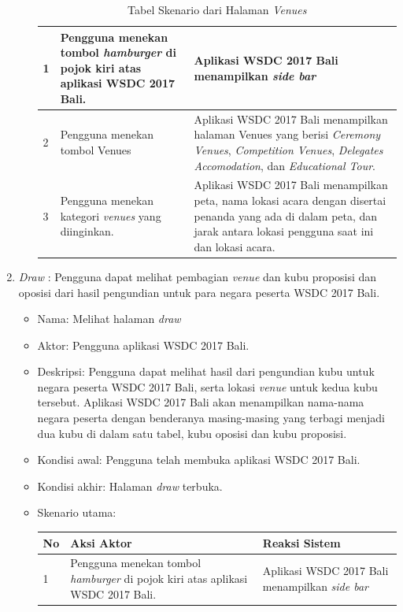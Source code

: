 \begin{enumerate}
\begin{itemize}
\begin{table}[H]
\begin{tabular}{|p{0.5cm}|p{7cm}|p{7cm}|}
				1  & Pengguna menekan tombol {\it hamburger} di pojok kiri atas aplikasi WSDC 2017 Bali. & Aplikasi WSDC 2017 Bali menampilkan {\it side bar} \\ \hline
				2  & Pengguna menekan tombol Venues & Aplikasi WSDC 2017 Bali menampilkan halaman Venues yang berisi {\it Ceremony Venues}, {\it Competition Venues}, {\it Delegates Accomodation}, dan {\it Educational Tour}.\\ \hline
				3  & Pengguna menekan kategori {\it venues} yang diinginkan. & Aplikasi WSDC 2017 Bali menampilkan peta, nama lokasi acara dengan disertai penanda yang ada di dalam peta, dan jarak antara lokasi pengguna saat ini dan lokasi acara.\\ \hline
			\end{tabular}
			\caption{Tabel Skenario dari Halaman {\it Venues}}
			\label{table:skenarioHalamanVenues}
		\end{table}
	\end{itemize}
	\item {\it Draw} : Pengguna dapat melihat pembagian {\it venue} dan kubu proposisi dan oposisi dari hasil pengundian untuk para negara peserta WSDC 2017 Bali.
	\begin{itemize}
		\item Nama: Melihat halaman {\it draw}
		\item Aktor: Pengguna aplikasi WSDC 2017 Bali.
		\item Deskripsi: Pengguna dapat melihat hasil dari pengundian kubu untuk negara peserta WSDC 2017 Bali, serta lokasi {\it venue} untuk kedua kubu tersebut. Aplikasi WSDC 2017 Bali akan menampilkan nama-nama negara peserta dengan benderanya masing-masing yang terbagi menjadi dua kubu di dalam satu tabel, kubu oposisi dan kubu proposisi.
		\item Kondisi awal: Pengguna telah membuka aplikasi WSDC 2017 Bali.
		\item Kondisi akhir: Halaman {\it draw} terbuka.
		\item Skenario utama: \\
		\begin{table}[H]
			\centering
			\begin{tabular}{|p{0.5cm}|p{7cm}|p{7cm}|}
				\hline
				No & Aksi Aktor                               & Reaksi Sistem                                          \\ \hline
				1  & Pengguna menekan tombol {\it hamburger} di pojok kiri atas aplikasi WSDC 2017 Bali. & Aplikasi WSDC 2017 Bali menampilkan {\it side bar} \\ \hline

\end{tabular}
\end{table}
\end{itemize}
\end{enumerate}

